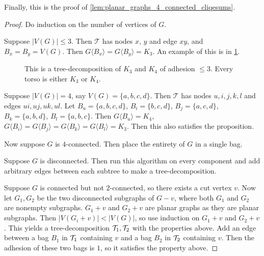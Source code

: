 Finally, this is the proof of \cref{lem:planar_graphs_4_connected_cliqesums}.
\begin{proof}
	Do induction on the number of vertices of $G$. 
	
	Suppose $|V(G)| \leq 3$. Then $\mathcal{T}$ has nodes $x$, $y$ and edge $xy$, and $B_x = B_y = V(G)$. Then $G \langle B_x \rangle = G \langle B_y \rangle = K_3$. An example of this is in \cref{fig:treedecomp_k4}. 

	\begin{figure}[h!]
		
		\caption[Tree-decomposition of $K_4$]{This is a tree-decomposition of $K_3$ and $K_4$ of adhesion $\leq 3$. Every torso is either $K_3$ or $K_4$.}\label{fig:treedecomp_k4}
	\end{figure}
	
	Suppose $|V(G)| = 4$, say $V(G) = \{a,b,c,d\}$.  Then $\mathcal{T}$ has nodes $u, i,j,k,l$ and edges $ui, uj, uk, ul$. Let $B_u = \{a,b,c,d\}$, $B_i = \{b,c,d\}$, $B_j = \{a,c,d\}$, $B_k = \{a,b,d\}$, $B_l = \{a,b,c\}$. Then $G\langle B_u \rangle = K_4$, $G\langle B_i \rangle =G\langle B_j\rangle = G\langle B_k \rangle = G\langle B_l \rangle = K_3$. Then this also satisfies the proposition. 

	Now suppose $G$ is $4$-connected. Then place the entirety of $G$ in a single bag.

	Suppose $G$ is disconnected. Then run this algorithm on every component and add arbitrary edges between each subtree to make a tree-decomposition.

	Suppose $G$ is connected but not $2$-connected, so there exists a cut vertex $v$. Now let $G_1, G_2$ be the two disconnected subgraphs of $G - v$, where both $G_1$ and $G_2$ are nonempty subgraphs. $G_1 + v$ and $G_2 + v$ are planar graphs as they are planar subgraphs. Then $|V(G_i + v)| < |V(G)|$, so use induction on $G_1 + v$ and $G_2 + v$. This yields a tree-decomposition $\mathcal{T}_1, \mathcal{T}_2$ with the properties above. Add an edge between a bag $B_1$ in $\mathcal{T}_1$ containing $v$ and a bag $B_2$ in $\mathcal{T}_2$ containing $v$. Then the adhesion of these two bags is $1$, so it satisfies the property above. 


\end{proof}
